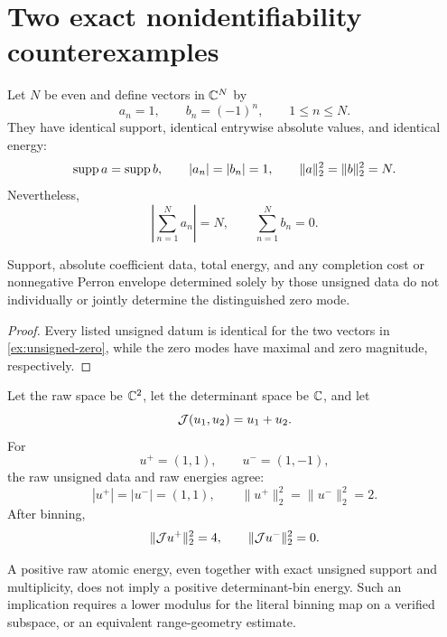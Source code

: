 \section{Two exact nonidentifiability counterexamples}
\label{sec:counterexamples}

\begin{example}
\label{ex:unsigned-zero}
Let \(N\) be even and define vectors in \(\mathbb C^N\) by
\[
 a_n=1,\qquad b_n=(-1)^n,\qquad 1\le n\le N.
\]
They have identical support, identical entrywise absolute values, and
identical energy:
\[
 \operatorname{supp} a=\operatorname{supp} b,\qquad |a_n|=|b_n|=1,\qquad
 \|a\|_2^2=\|b\|_2^2=N.
\]
Nevertheless,
\[
 \left|\sum_{n=1}^Na_n\right|=N,\qquad
 \sum_{n=1}^Nb_n=0.
\]
\end{example}

\begin{proposition}
\label{prop:unsigned-nonidentifiability}
Support, absolute coefficient data, total energy, and any completion
cost or nonnegative Perron envelope determined solely by those
unsigned data do not individually or jointly determine the
distinguished zero mode.
\end{proposition}

\begin{proof}
Every listed unsigned datum is identical for the two vectors in
\cref{ex:unsigned-zero}, while the zero modes have maximal and zero
magnitude, respectively.
\end{proof}

\begin{example}
\label{ex:bin-cancellation}
Let the raw space be \(\mathbb C^2\), let the determinant space be
\(\mathbb C\), and let
\[
 \mathcal J(u_1,u_2)=u_1+u_2.
\]
For
\[
 u^+=(1,1),\qquad u^-=(1,-1),
\]
the raw unsigned data and raw energies agree:
\[
 |u^+|=|u^-|=(1,1),\qquad
 \|u^+\|_2^2=\|u^-\|_2^2=2.
\]
After binning,
\[
 \|\mathcal J u^+\|_2^2=4,\qquad
 \|\mathcal J u^-\|_2^2=0.
\]
\end{example}

\begin{proposition}
\label{prop:raw-bin-nonidentifiability}
A positive raw atomic energy, even together with exact unsigned
support and multiplicity, does not imply a positive determinant-bin
energy.  Such an implication requires a lower modulus for the literal
binning map on a verified subspace, or an equivalent range-geometry
estimate.
\end{proposition}

